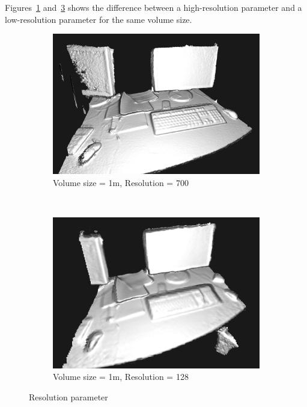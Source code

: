 \documentclass[12pt]{article}
\begin{document}
Figures~\ref{fig:highres} and~\ref{fig:lowres} shows the difference between a high-resolution parameter and a low-resolution parameter for the same volume size.

\begin{figure}[h]
        \centering
        \begin{subfigure}[b]{0.45\textwidth}
                \includegraphics[width=1\textwidth]{HighRes.png}
                \caption{Volume size = 1m, Resolution = 700}
                \label{fig:highres}
        \end{subfigure}~
        \begin{subfigure}[b]{0.45\textwidth}
                \includegraphics[width=1\textwidth]{LowRes.png}
                \caption{Volume size = 1m, Resolution = 128}
                \label{fig:lowres}
        \end{subfigure}
        \caption{Resolution parameter}
        \par
\end{figure}
\end{document}
